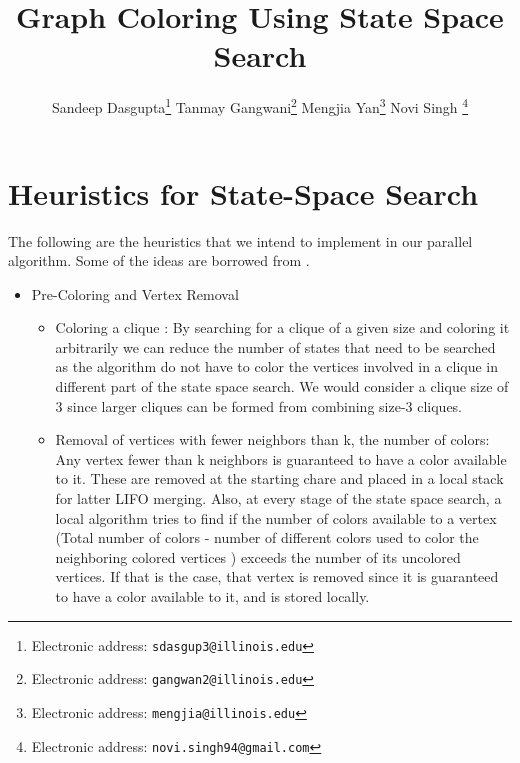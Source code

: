 \documentclass[10pt,twoside]{article}
\title{\textbf{Graph Coloring Using State Space Search}}
\author{Sandeep Dasgupta\thanks{Electronic address: \texttt{sdasgup3@illinois.edu}}
\qquad Tanmay Gangwani\thanks{Electronic address: \texttt{gangwan2@illinois.edu}}
\qquad Mengjia Yan\thanks{Electronic address: \texttt{mengjia@illinois.edu}}
\qquad  Novi Singh \thanks{Electronic address: \texttt{novi.singh94@gmail.com}}}
\begin{document}
\thispagestyle{empty}

\maketitle
\section{Heuristics for State-Space Search}
The following are the heuristics that we intend to implement in our parallel algorithm. Some of the ideas are borrowed from \cite{Kale1995}.
\begin{itemize}  \item Pre-Coloring and Vertex Removal 
    \begin{itemize} 
      \item Coloring a clique : By searching for a clique of a given size and
        coloring it arbitrarily we can reduce the number of states that need to
        be searched as the algorithm do not have to color the vertices involved
        in a clique in different part of the state space search.  We would
        consider a clique size of 3 since larger cliques can be formed from
        combining size-3 cliques.

    \item Removal of vertices with fewer neighbors than k, the number of colors:
      Any vertex fewer than k neighbors is guaranteed to have a color available
      to it. These are removed at the starting chare and placed in a local
      stack for latter LIFO merging. Also, at every stage of the state space
      search, a local algorithm tries to find if the number of colors available
      to a vertex (Total number of colors - number of different colors used to
          color the neighboring colored vertices ) exceeds the number of its
      uncolored vertices.  If that is the case, that vertex is removed since it
      is guaranteed to have a color available to it, and is stored locally.
    \end{itemize}


\end{itemize}
\end{document}
